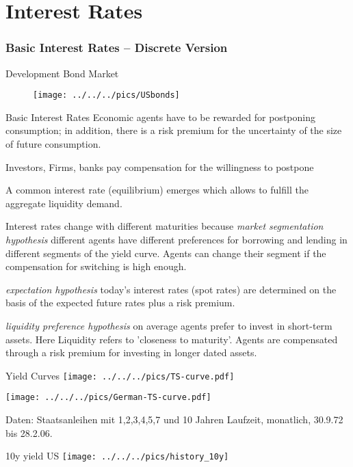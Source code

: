 \part{Interest Rates}
\section{Basic Interest Rates -- Discrete Version}

Development Bond Market
	\begin{figure}
		\centering
			\texttt{[image: ../../../pics/USbonds]}
		\label{fig:Risk_map}
	\end{figure}


Basic Interest Rates
	Economic agents have to be rewarded for postponing consumption; in addition, there is a risk premium for the uncertainty of the size of future consumption.
	
	Investors, Firms, banks pay compensation for the willingness to postpone
	
	A common interest rate (equilibrium) emerges which allows to fulfill the aggregate liquidity demand.

	Interest rates change with different maturities because
		{\it market segmentation hypothesis} different agents have different preferences for borrowing and lending in different 
		segments of the yield curve. Agents can change their segment if the compensation 	for switching is high enough.
 
		{\it expectation hypothesis} today's interest rates (spot rates) are determined on the basis of the expected future rates plus a risk premium.
		
		{\it liquidity preference hypothesis } on average agents prefer to invest in short-term assets. 
		Here Liquidity refers to 'closeness to maturity'. Agents are compensated through a risk premium for investing in longer dated assets.


Yield Curves
	\texttt{[image: ../../../pics/TS-curve.pdf]}

	\texttt{[image: ../../../pics/German-TS-curve.pdf]}

	{\tiny Daten: Staatsanleihen mit 1,2,3,4,5,7 und 10 Jahren Laufzeit, monatlich,
	30.9.72 bis 28.2.06.}


10y yield US
\texttt{[image: ../../../pics/history\_10y]}



